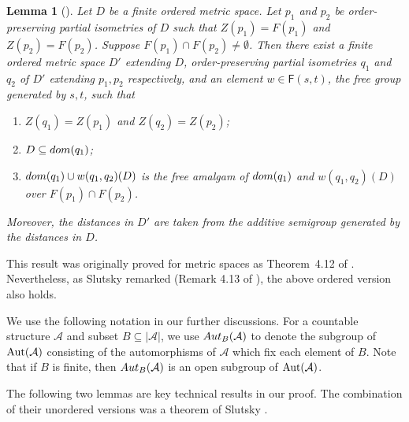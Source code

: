 \documentclass{amsart}
\newtheorem{lemma}[theorem]{Lemma}
\theoremstyle{definition}
\theoremstyle{remark}
\begin{document}
    \begin{lemma}[\cite{Slutsky}]\label{lemma:Extensions}
        Let $D$ be a finite ordered metric space. Let $p_1$ and $p_2$ be order-preserving partial isometries of $D$ such that $Z(p_1)=F(p_1)$ and $Z(p_2)=F(p_2)$. Suppose $F(p_1) \cap F(p_2) \neq \emptyset$. Then there exist a finite ordered metric space $D'$ extending $D$, order-preserving  partial isometries $q_1$ and $q_2$ of $D'$ extending $p_1,p_2$ respectively, and an element $w \in \mathsf{F}(s,t)$, the free group generated by ${s,t}$, such that 
        \begin{enumerate}
           \item $Z(q_1)=Z(p_1)$ and $Z(q_2)=Z(p_2)$;
           \item $D \subseteq {\rm dom}(q_1)$;
           \item ${\rm dom}(q_1) \cup w(q_1,q_2)(D)$ is the free amalgam of ${\rm dom}(q_1)$ and \linebreak $w(q_1,q_2)(D)$ over $F(p_1) \cap F(p_2)$. %
        \end{enumerate}
        Moreover, the distances in $D'$ are taken from the additive semigroup generated by the distances in $D$. 
     \end{lemma}

     This result was originally proved for metric spaces as Theorem~4.12 of \cite{Slutsky}. Nevertheless, as Slutsky remarked (Remark 4.13 of \cite{Slutsky}), the above ordered version also holds. 


We use the following notation in our further discussions. For a countable structure $\mathcal{A}$ and subset $B \subseteq |\mathcal{A}|$, we use ${\rm Aut}_B(\mathcal{A})$ to denote the subgroup of $\mbox{\rm Aut}(\mathcal{A})$ consisting of the automorphisms of $\mathcal{A}$ which fix each element of $B$. Note that if $B$ is finite, then ${\rm Aut}_B(\mathcal{A})$ is an open subgroup of $\mbox{\rm Aut}(\mathcal{A})$. 

 The following two lemmas are key technical results in our proof. The combination of their unordered versions was a theorem of Slutsky \cite{Slutsky}. 
\end{document}
